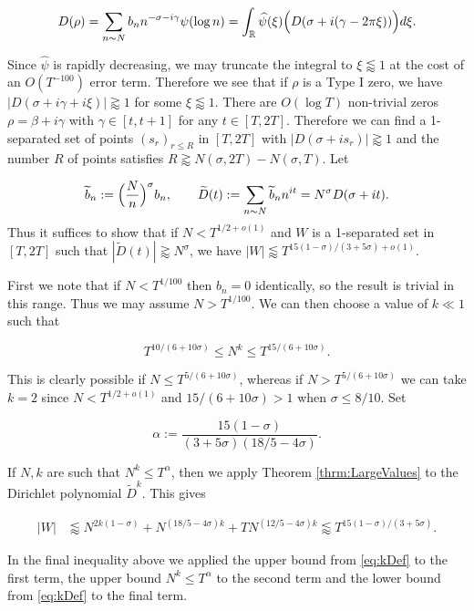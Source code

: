 \documentclass{amsart}
\theoremstyle{plain}
\numberwithin{equation}{section}
\renewcommand{\tilde}{\widetilde}
\begin{document}
\[
D(\rho)=\sum_{n\sim N}b_n n^{-\sigma-i\gamma}\psi(\log{n})=\int_{\mathbb{R}}\widehat{\psi}(\xi)\Bigl(D(\sigma+i(\gamma-2\pi \xi))\Bigr)d\xi.
\]

Since $\widehat{\psi}$ is rapidly decreasing, we may truncate the integral to $\xi\lessapprox 1$ at the cost of an $O(T^{-100})$ error term. Therefore we see that if $\rho$ is a Type I zero, we have $|D(\sigma+i\gamma+i\xi)|\gtrapprox 1$ for some $\xi\lessapprox 1$. There are $O(\log{T})$ non-trivial zeros $\rho=\beta+i\gamma$ with $\gamma \in [t,t+1]$ for any $t\in [T,2T]$. Therefore we can find a 1-separated set of points $(s_r)_{r\le R}$ in $[T,2T]$ with $|D(\sigma+is_r)|\gtrapprox 1$ and the number $R$ of points satisfies $R\gtrapprox N(\sigma,2T)-N(\sigma,T)$. Let

\[
\tilde{b}_n:=\Bigl(\frac{N}{n}\Bigr)^\sigma b_n,\qquad \tilde{D}(t):=\sum_{n\sim N}\tilde{b}_nn^{it}=N^\sigma D(\sigma+it).
\]
Thus it suffices to show that if $N<T^{1/2+o(1)}$ and $W$ is a 1-separated set in $[T,2T]$ such that $|\tilde{D}(t)|\gtrapprox N^\sigma$, we have $|W|\lessapprox T^{15(1-\sigma)/(3+5\sigma)+o(1)}$.

First we note that if $N<T^{1/100}$ then $b_n=0$ identically, so the result is trivial in this range. Thus we may assume $N>T^{1/100}$. We can then choose a value of $k\ll 1$ such that

\begin{equation}
T^{10/(6+10\sigma)}\le N^k\le T^{15/(6+10\sigma)}.
\label{eq:kDef}
\end{equation}

This is clearly possible if $N\le T^{5/(6+10\sigma)}$, whereas if $N>T^{5/(6+10\sigma)}$ we can take $k=2$ since $N<T^{1/2+o(1)}$ and $15/(6+10\sigma)>1$ when $\sigma\le 8/10$. Set

\[
\alpha:=\frac{15(1-\sigma)}{(3+5\sigma)(18/5-4\sigma)}.
\]

If $N,k$ are such that $N^k\le T^\alpha$, then we apply Theorem \ref{thrm:LargeValues} to the Dirichlet polynomial $\tilde{D}^k$. This gives

\begin{align*}
|W|&\lessapprox N^{2k(1-\sigma)}+N^{(18/5-4\sigma)k}+TN^{(12/5-4\sigma)k}\lessapprox T^{15(1-\sigma)/(3+5\sigma)}.
\end{align*}

In the final inequality above we applied the upper bound from \eqref{eq:kDef} to the first term, the upper bound $N^k\le T^\alpha$ to the second term and the lower bound from \eqref{eq:kDef} to the final term.
\end{document}
